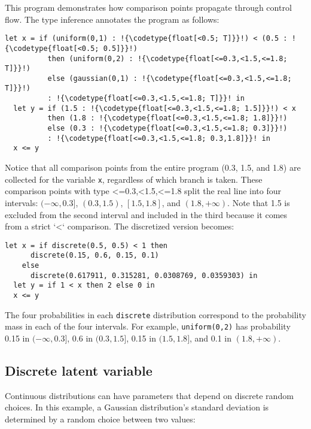 \documentclass[acmsmall,screen,dvipsnames,x11names,nonacm,anonymous,review]{acmart}
\newcommand{\codetype}[1]{\textcolor{typecolor}{\ttfamily\small#1}}
\begin{document}
\noindent This program demonstrates how comparison points propagate through control flow. The type inference annotates the program as follows:

\begin{lstlisting}[aboveskip=1em,belowskip=1em,escapechar=!]
  let x = if (uniform(0,1) : !{\codetype{float[<0.5; T]}}!) < (0.5 : !{\codetype{float[<0.5; 0.5]}}!)
          then (uniform(0,2) : !{\codetype{float[<=0.3,<1.5,<=1.8; T]}}!)
          else (gaussian(0,1) : !{\codetype{float[<=0.3,<1.5,<=1.8; T]}}!)
          : !{\codetype{float[<=0.3,<1.5,<=1.8; T]}}! in
  let y = if (1.5 : !{\codetype{float[<=0.3,<1.5,<=1.8; 1.5]}}!) < x
          then (1.8 : !{\codetype{float[<=0.3,<1.5,<=1.8; 1.8]}}!)
          else (0.3 : !{\codetype{float[<=0.3,<1.5,<=1.8; 0.3]}}!)
          : !{\codetype{float[<=0.3,<1.5,<=1.8; 0.3,1.8]}}! in
  x <= y
\end{lstlisting}

\noindent Notice that all comparison points from the entire program (0.3, 1.5, and 1.8) are collected for the variable \texttt{x}, regardless of which branch is taken. These comparison points with type \codetype{<=0.3,<1.5,<=1.8} split the real line into four intervals: $(-\infty, 0.3]$, $(0.3, 1.5)$, $[1.5, 1.8]$, and $(1.8, +\infty)$. Note that 1.5 is excluded from the second interval and included in the third because it comes from a strict `<` comparison. The discretized version becomes:

\begin{lstlisting}[aboveskip=1em,belowskip=1em]
  let x = if discrete(0.5, 0.5) < 1 then
      discrete(0.15, 0.6, 0.15, 0.1)
    else
      discrete(0.617911, 0.315281, 0.0308769, 0.0359303) in
  let y = if 1 < x then 2 else 0 in
  x <= y
\end{lstlisting}

\noindent The four probabilities in each \texttt{discrete} distribution correspond to the probability mass in each of the four intervals. For example, \texttt{uniform(0,2)} has probability 0.15 in $(-\infty, 0.3]$, 0.6 in $(0.3, 1.5]$, 0.15 in $(1.5, 1.8]$, and 0.1 in $(1.8, +\infty)$.

\subsection{Discrete latent variable}

Continuous distributions can have parameters that depend on discrete random choices. In this example, a Gaussian distribution's standard deviation is determined by a random choice between two values:
\end{document}

